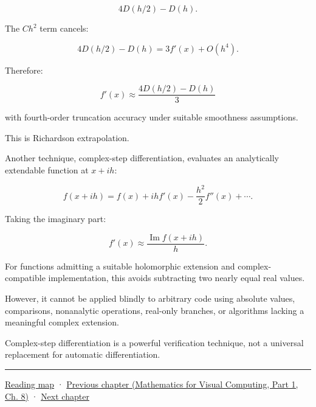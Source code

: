 \[
4D(h/2)-D(h).
\]

The \(Ch^2\) term cancels:

\[
4D(h/2)-D(h) = 3f'(x)+O(h^4).
\]

Therefore:

\[
\boxed{ f'(x)\approx \frac{4D(h/2)-D(h)}3 }
\]

with fourth-order truncation accuracy under suitable smoothness assumptions.

This is Richardson extrapolation.

Another technique, complex-step differentiation, evaluates an analytically extendable function at \(x+ih\):

\[
f(x+ih) = f(x)+ihf'(x) -\frac{h^2}{2}f''(x)+\cdots.
\]

Taking the imaginary part:

\[
\boxed{ f'(x)\approx \frac{\operatorname{Im}f(x+ih)}h }.
\]

For functions admitting a suitable holomorphic extension and complex-compatible implementation, this avoids subtracting two nearly equal real values.

However, it cannot be applied blindly to arbitrary code using absolute values, comparisons, nonanalytic operations, real-only branches, or algorithms lacking a meaningful complex extension.

Complex-step differentiation is a powerful verification technique, not a universal replacement for automatic differentiation.

\begin{center}\rule{0.5\linewidth}{0.5pt}\end{center}

\hyperref[volume-reading-map]{Reading map} · \href{../02-Mathematics-for-Visual-Computing-P01/main.pdf\#nameddest=02-foundations-ii-ch024-waiting-times-covariance-and-matrix-decomposition}{Previous chapter (Mathematics for Visual Computing, Part 1, Ch. 8)} · \hyperref[02-foundations-ii-ch026-matrix-functions-and-nonlinear-least-squares]{Next chapter}
